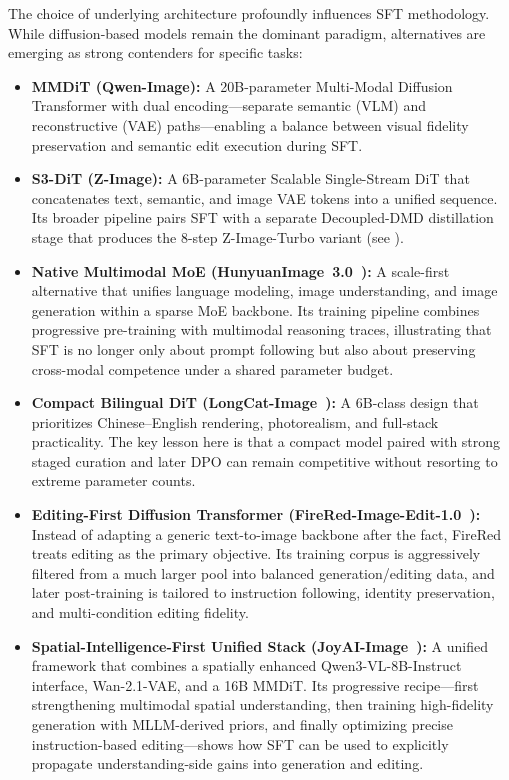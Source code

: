 \documentclass{llmxive}
\begin{document}
The choice of underlying architecture profoundly influences SFT methodology. While diffusion-based models remain the dominant paradigm, alternatives are emerging as strong contenders for specific tasks:
\begin{itemize}[leftmargin=*,itemsep=2pt]
    \item \textbf{MMDiT (Qwen-Image):} A 20B-parameter Multi-Modal Diffusion Transformer with dual encoding---separate semantic (VLM) and reconstructive (VAE) paths---enabling a balance between visual fidelity preservation and semantic edit execution during SFT.
    \item \textbf{S3-DiT (Z-Image):} A 6B-parameter Scalable Single-Stream DiT that concatenates text, semantic, and image VAE tokens into a unified sequence. Its broader pipeline pairs SFT with a separate Decoupled-DMD distillation stage that produces the 8-step Z-Image-Turbo variant (see ).
    \item \textbf{Native Multimodal MoE (HunyuanImage~3.0~\citep{cao2025hunyuanimage}):} A scale-first alternative that unifies language modeling, image understanding, and image generation within a sparse MoE backbone. Its training pipeline combines progressive pre-training with multimodal reasoning traces, illustrating that SFT is no longer only about prompt following but also about preserving cross-modal competence under a shared parameter budget.
    \item \textbf{Compact Bilingual DiT (LongCat-Image~\citep{team2025longcat}):} A 6B-class design that prioritizes Chinese--English rendering, photorealism, and full-stack practicality. The key lesson here is that a compact model paired with strong staged curation and later DPO can remain competitive without resorting to extreme parameter counts.
    \item \textbf{Editing-First Diffusion Transformer (FireRed-Image-Edit-1.0~\citep{team2026firered}):} Instead of adapting a generic text-to-image backbone after the fact, FireRed treats editing as the primary objective. Its training corpus is aggressively filtered from a much larger pool into balanced generation/editing data, and later post-training is tailored to instruction following, identity preservation, and multi-condition editing fidelity.
    \item \textbf{Spatial-Intelligence-First Unified Stack (JoyAI-Image~\citep{jdjoyaiimage}):} A unified framework that combines a spatially enhanced Qwen3-VL-8B-Instruct interface, Wan-2.1-VAE, and a 16B MMDiT. Its progressive recipe---first strengthening multimodal spatial understanding, then training high-fidelity generation with MLLM-derived priors, and finally optimizing precise instruction-based editing---shows how SFT can be used to explicitly propagate understanding-side gains into generation and editing.

\end{itemize}
\end{document}

